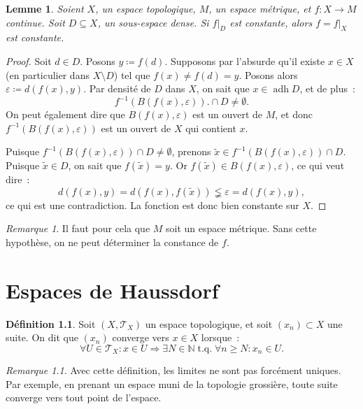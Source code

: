 \documentclass{report}
\newtheorem{lem}[thm]{Lemme}
\theoremstyle{definition}
\newtheorem{déf}[thm]{Définition}
\theoremstyle{remark}
\newtheorem*{rmq}{Remarque}
\DeclareMathOperator{\tq}{\text{ t.q. }}
\DeclareMathOperator{\adh}{adh}
\newcommand{\restr}[2]{\left.#1\right|_{#2}}
\newcommand{\N}{\mathbb N}
\renewcommand{\top}{\mathcal T}
\begin{document}
		\begin{lem} Soient $X$, un espace topologique, $M$, un espace métrique, et $f : X \to M$ continue. Soit $D \subseteq X$, un sous-espace dense. Si $\restr fD$
		est constante, alors $f = \restr fX$ est constante.
		\end{lem}

		\begin{proof} Soit $d \in D$. Posons $y \coloneqq f(d)$. Supposons par l'absurde qu'il existe $x \in X$ (en particulier dans $X \setminus D$) tel que
		$f(x) \neq f(d) = y$. Posons alors $\varepsilon \coloneqq d(f(x), y)$. Par densité de $D$ dans $X$, on sait que $x \in \adh D$, et de plus~:
		\[f^{-1}\left(B(f(x), \varepsilon)\right). \cap D \neq \emptyset.\]
		On peut également dire que $B(f(x), \varepsilon)$ est un ouvert de $M$, et donc $f^{-1}\left(B(f(x), \varepsilon)\right)$ est un ouvert de $X$ qui contient $x$.

		Puisque $f^{-1}\left(B(f(x), \varepsilon)\right) \cap D \neq \emptyset$, prenons $\widetilde x \in f^{-1}\left(B(f(x), \varepsilon)\right) \cap D$. Puisque
		$\widetilde x \in D$, on sait que $f(\widetilde x) = y$. Or $f(\widetilde x) \in B(f(x), \varepsilon)$, ce qui veut dire~:
		\[d(f(x), y) = d(f(x), f(\widetilde x)) \lneqq \varepsilon = d(f(x), y),\]
		ce qui est une contradiction. La fonction est donc bien constante sur $X$.
		\end{proof}

		\begin{rmq} Il faut pour cela que $M$ soit un espace métrique. Sans cette hypothèse, on ne peut déterminer la constance de $f$.
		\end{rmq}

\chapter{Espaces de Haussdorf}
	\begin{déf} Soit $(X, \top_X)$ un espace topologique, et soit $(x_n) \subset X$ une suite. On dit que $(x_n)$ converge vers $x \in X$ lorsque~:
	\[\forall U \in \top_X : x \in U \Rightarrow \exists N \in \N \tq \forall n \geq N : x_n \in U.\]
	\end{déf}

	\begin{rmq} Avec cette définition, les limites ne sont pas forcément uniques. Par exemple, en prenant un espace muni de la topologie grossière, toute suite
	converge vers tout point de l'espace.
	\end{rmq}
\end{document}
